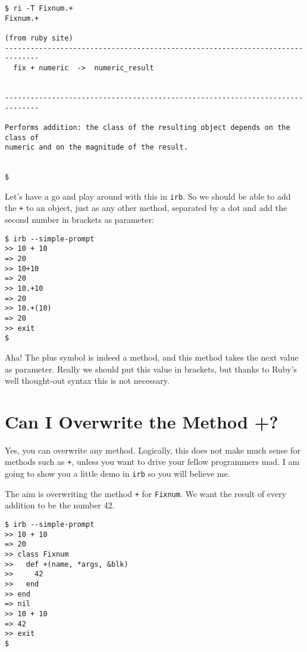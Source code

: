 \documentclass[a4paper]{book}
\begin{document}
\begin{shaded}\begin{verbatim}
$ ri -T Fixnum.+
Fixnum.+

(from ruby site)
------------------------------------------------------------------------------
  fix + numeric  ->  numeric_result


------------------------------------------------------------------------------

Performs addition: the class of the resulting object depends on the class of
numeric and on the magnitude of the result.


$
\end{verbatim}\end{shaded}

Let's have a go and play around with this in \texttt{irb}. So we should be able to add the \texttt{+} to an object, just as any other method, separated by a dot and add the second number in brackets as parameter:

\begin{shaded}\begin{verbatim}
$ irb --simple-prompt
>> 10 + 10
=> 20
>> 10+10
=> 20
>> 10.+10
=> 20
>> 10.+(10)
=> 20
>> exit
$
\end{verbatim}\end{shaded}

Aha! The plus symbol is indeed a method, and this method takes the next value as parameter. Really we should put this value in brackets, but thanks to Ruby's well thought-out syntax this is not necessary.

\section{Can I Overwrite the Method +?}\label{can-i-overwrite-the-method}

Yes, you can overwrite any method. Logically, this does not make much sense for methods such as \texttt{+}, unless you want to drive your fellow programmers mad. I am going to show you a little demo in \texttt{irb} so you will believe me.

The aim is overwriting the method \texttt{+} for \texttt{Fixnum}. We want the result of every addition to be the number 42.

\begin{shaded}\begin{verbatim}
$ irb --simple-prompt
>> 10 + 10
=> 20
>> class Fixnum
>>   def +(name, *args, &blk)
>>     42
>>   end
>> end
=> nil
>> 10 + 10
=> 42
>> exit
$
\end{verbatim}\end{shaded}
\end{document}
